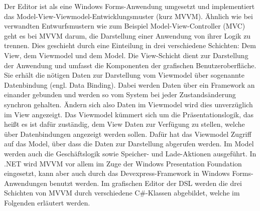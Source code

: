 Der Editor ist als eine Windows Forms-Anwendung umgesetzt und implementiert das Model-View-Viewmodel-Entwicklungsmuster (kurz MVVM). Ähnlich wie bei verwandten Entwurfsmustern wie zum Beispiel Model-View-Controller (MVC) geht es bei MVVM darum, die Darstellung einer Anwendung von ihrer Logik zu trennen. Dies geschieht durch eine Einteilung in drei verschiedene Schichten: Dem View, dem Viewmodel und dem Model. Die View-Schicht dient zur Darstellung der Anwendung und umfasst die Komponenten der grafischen Benutzeroberfläche. Sie erhält die nötigen Daten zur Darstellung vom Viewmodel über sogenannte Datenbindung (engl. Data Binding). Dabei werden Daten über ein Framework an einander gebunden und werden so vom System bei jeder Zustandsänderung synchron gehalten. Ändern sich also Daten im Viewmodel wird dies unverzüglich im View angezeigt. Das Viewmodel kümmert sich um die Präsentationslogik, das heißt es ist dafür zuständig, dem View Daten zur Verfügung zu stellen, welche über Datenbindungen angezeigt werden sollen. Dafür hat das Viewmodel Zugriff auf das Model, über dass die Daten zur Darstellung abgerufen werden. Im Model werden auch die Geschäftslogik sowie Speicher- und Lade-Aktionen ausgeführt. In .NET wird MVVM vor allem im Zuge der Windows Presentation Foundation eingesetzt, kann aber auch durch das Devexpress-Framework in Windows Forms-Anwendungen benutzt werden. 
\newline
Im grafischen Editor der DSL werden die drei Schichten von MVVM durch verschiedene C\#-Klassen abgebildet, welche im Folgenden erläutert werden.

